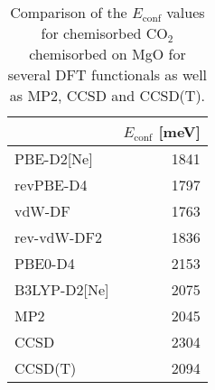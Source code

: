 \begin{table}
\caption{\label{tab:econf_co2}Comparison of the $E_\textrm{conf}$ values for chemisorbed CO$_2$ chemisorbed on MgO for several DFT functionals as well as MP2, CCSD and CCSD(T).}
\begin{tabular}{lr}
\toprule
 & $E_\textrm{conf}$ [meV] \\ 
\midrule
PBE-D2[Ne] & 1841 \\
revPBE-D4 & 1797 \\
vdW-DF & 1763 \\
rev-vdW-DF2 & 1836 \\
PBE0-D4 & 2153 \\
B3LYP-D2[Ne] & 2075 \\
MP2 & 2045 \\
CCSD & 2304 \\
CCSD(T) & 2094 \\
\bottomrule
\end{tabular}
\end{table}